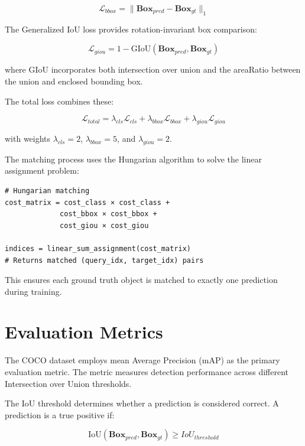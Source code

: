 \documentclass[12pt,a4paper]{article}
\newcommand{\B}[1]{\mathbf{#1}}
\begin{document}
\begin{equation}
\mathcal{L}_{bbox} = \|\B{Box}_{pred} - \B{Box}_{gt}\|_1
\end{equation}

The Generalized IoU loss provides rotation-invariant box comparison:

\begin{equation}
\mathcal{L}_{giou} = 1 - \text{GIoU}(\B{Box}_{pred}, \B{Box}_{gt})
\end{equation}

where GIoU incorporates both intersection over union and the areaRatio between the union and enclosed bounding box.

The total loss combines these:

\begin{equation}
\mathcal{L}_{total} = \lambda_{cls}\mathcal{L}_{cls} + \lambda_{bbox}\mathcal{L}_{bbox} + \lambda_{giou}\mathcal{L}_{giou}
\end{equation}

with weights $\lambda_{cls} = 2$, $\lambda_{bbox} = 5$, and $\lambda_{giou} = 2$.

The matching process uses the Hungarian algorithm to solve the linear assignment problem:

\begin{verbatim}
# Hungarian matching
cost_matrix = cost_class × cost_class + 
             cost_bbox × cost_bbox + 
             cost_giou × cost_giou
            
indices = linear_sum_assignment(cost_matrix)
# Returns matched (query_idx, target_idx) pairs
\end{verbatim}

This ensures each ground truth object is matched to exactly one prediction during training.

\section{Evaluation Metrics}

The COCO dataset employs mean Average Precision (mAP) as the primary evaluation metric. The metric measures detection performance across different Intersection over Union thresholds.

The IoU threshold determines whether a prediction is considered correct. A prediction is a true positive if:

\begin{equation}
\text{IoU}(\B{Box}_{pred}, \B{Box}_{gt}) \geq IoU_{threshold}
\end{equation}
\end{document}
